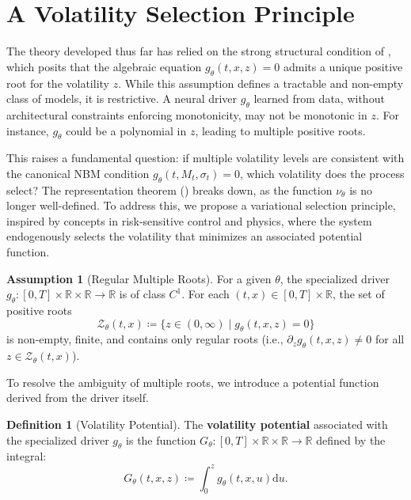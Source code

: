 \documentclass[qian]{imsart}
\newcommand{\R}{\mathbb{R}}
\newcommand{\dd}{\mathrm{d}}
\theoremstyle{plain}
\theoremstyle{definition}
\newtheorem{definition}[theorem]{Definition}
\newtheorem{assumption}[theorem]{Assumption}
\begin{document}
\section{A Volatility Selection Principle}
\label{sec:selection_principle}

The theory developed thus far has relied on the strong structural condition of , which posits that the algebraic equation $g_\theta(t,x,z) = 0$ admits a unique positive root for the volatility $z$. While this assumption defines a tractable and non-empty class of models, it is restrictive. A neural driver $g_\theta$ learned from data, without architectural constraints enforcing monotonicity, may not be monotonic in $z$. For instance, $g_\theta$ could be a polynomial in $z$, leading to multiple positive roots.

This raises a fundamental question: if multiple volatility levels are consistent with the canonical NBM condition $g_\theta(t,M_t,\sigma_t)=0$, which volatility does the process select? The representation theorem () breaks down, as the function $\nu_\theta$ is no longer well-defined. To address this, we propose a variational selection principle, inspired by concepts in risk-sensitive control and physics, where the system endogenously selects the volatility that minimizes an associated potential function.

\begin{assumption}[Regular Multiple Roots]
\label{ass:multiple_roots}
For a given $\theta$, the specialized driver $g_\theta: [0,T] \times \R \times \R \to \R$ is of class $C^1$. For each $(t,x) \in [0,T] \times \R$, the set of positive roots
\[ \mathcal{Z}_\theta(t,x) \coloneqq \{ z \in (0, \infty) \mid g_\theta(t,x,z)=0 \} \]
is non-empty, finite, and contains only regular roots (i.e., $\partial_z g_\theta(t,x,z) \neq 0$ for all $z \in \mathcal{Z}_\theta(t,x)$).
\end{assumption}

To resolve the ambiguity of multiple roots, we introduce a potential function derived from the driver itself.

\begin{definition}[Volatility Potential]
\label{def:vol_potential}
The \textbf{volatility potential} associated with the specialized driver $g_\theta$ is the function $G_\theta: [0,T] \times \R \times \R \to \R$ defined by the integral:
\[ G_\theta(t,x,z) \coloneqq \int_0^z g_\theta(t,x,u) \dd u. \]
\end{definition}
\end{document}
